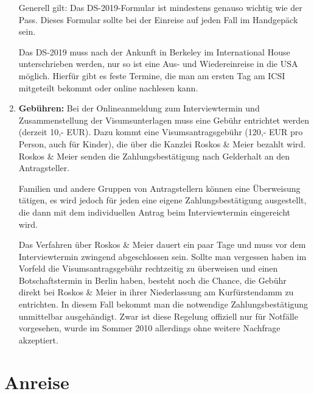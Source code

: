 \documentclass[a4paper]{scrreprt}
\begin{document}
\begin{enumerate}
	Generell gilt: Das DS-2019-Formular ist mindestens genauso wichtig wie der Pass. Dieses Formular sollte bei der
Einreise auf jeden Fall im Handgepäck sein.
	
	Das DS-2019 muss nach der Ankunft in Berkeley im International House unterschrieben werden, nur so ist eine Aus- und Wiedereinreise in die USA m\"oglich. Hierfür gibt es feste Termine, die man am ersten Tag am ICSI mitgeteilt bekommt oder online nachlesen kann.

	\item \textbf{Gebühren:} Bei der Onlineanmeldung zum Interviewtermin und Zusammenstellung der Visumsunterlagen muss eine Gebühr entrichtet werden (derzeit 10,- EUR). Dazu kommt eine Visumsantragsgebühr (120,- EUR pro Person, auch für Kinder), die über die Kanzlei Roskos \& Meier bezahlt wird. Roskos \& Meier senden die Zahlungsbestätigung nach Gelderhalt an den Antragsteller.

	Familien und andere Gruppen von Antragstellern können eine Überweisung tätigen, es wird jedoch für jeden eine eigene Zahlungsbestätigung ausgestellt, die dann mit dem individuellen Antrag beim Interviewtermin eingereicht wird.
	
	Das Verfahren über Roskos \& Meier dauert ein paar Tage und muss vor dem Interviewtermin zwingend abgeschlossen sein. Sollte man vergessen haben im Vorfeld die Visumsantragsgebühr rechtzeitig zu überweisen und einen Botschaftstermin in Berlin haben, besteht noch die Chance, die Gebühr direkt bei Roskos \& Meier in ihrer Niederlassung am Kurfürstendamm zu entrichten. In diesem Fall bekommt man die notwendige Zahlungsbestätigung unmittelbar ausgehändigt. Zwar ist diese Regelung offiziell nur für Notfälle vorgesehen, wurde im Sommer 2010 allerdings ohne weitere Nachfrage akzeptiert. 
	
\end{enumerate}

\section{Anreise}
\end{document}

